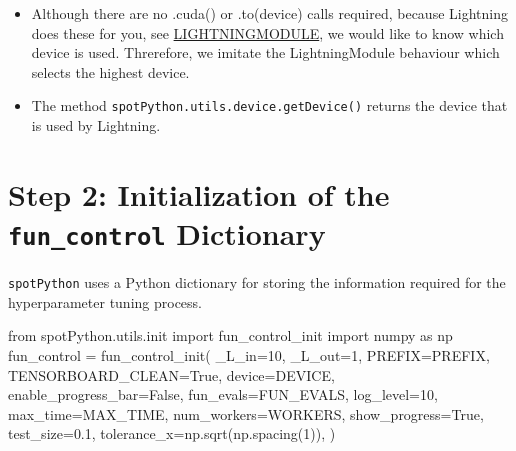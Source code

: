 \documentclass[
  letterpaper,
  DIV=11,
  numbers=noendperiod]{scrreprt}
\newenvironment{Shaded}{\begin{snugshade}}{\end{snugshade}}
\newcommand{\DecValTok}[1]{\textcolor[rgb]{0.68,0.00,0.00}{#1}}
\newcommand{\FloatTok}[1]{\textcolor[rgb]{0.68,0.00,0.00}{#1}}
\newcommand{\ImportTok}[1]{\textcolor[rgb]{0.00,0.46,0.62}{#1}}
\newcommand{\NormalTok}[1]{\textcolor[rgb]{0.00,0.23,0.31}{#1}}
\newcommand{\OperatorTok}[1]{\textcolor[rgb]{0.37,0.37,0.37}{#1}}
\newcommand{\VariableTok}[1]{\textcolor[rgb]{0.07,0.07,0.07}{#1}}
\providecommand{\tightlist}{%
  \setlength{\itemsep}{0pt}\setlength{\parskip}{0pt}}\usepackage{longtable,booktabs,array}
\begin{document}
\begin{tcolorbox}[enhanced jigsaw, rightrule=.15mm, coltitle=black, title=\textcolor{quarto-callout-note-color}{\faInfo}\hspace{0.5em}{Note: Device selection}, opacitybacktitle=0.6, bottomrule=.15mm, opacityback=0, left=2mm, colback=white, leftrule=.75mm, colframe=quarto-callout-note-color-frame, colbacktitle=quarto-callout-note-color!10!white, toprule=.15mm, toptitle=1mm, bottomtitle=1mm, titlerule=0mm, breakable, arc=.35mm]

\begin{itemize}
\tightlist
\item
  Although there are no .cuda() or .to(device) calls required, because
  Lightning does these for you, see
  \href{https://lightning.ai/docs/pytorch/stable/common/lightning_module.html}{LIGHTNINGMODULE},
  we would like to know which device is used. Threrefore, we imitate the
  LightningModule behaviour which selects the highest device.
\item
  The method \texttt{spotPython.utils.device.getDevice()} returns the
  device that is used by Lightning.
\end{itemize}

\end{tcolorbox}

\section{\texorpdfstring{Step 2: Initialization of the
\texttt{fun\_control}
Dictionary}{Step 2: Initialization of the fun\_control Dictionary}}\label{step-2-initialization-of-the-fun_control-dictionary}

\texttt{spotPython} uses a Python dictionary for storing the information
required for the hyperparameter tuning process.

\begin{Shaded}
\begin{Highlighting}[]
\ImportTok{from}\NormalTok{ spotPython.utils.init }\ImportTok{import}\NormalTok{ fun\_control\_init}
\ImportTok{import}\NormalTok{ numpy }\ImportTok{as}\NormalTok{ np}
\NormalTok{fun\_control }\OperatorTok{=}\NormalTok{ fun\_control\_init(}
\NormalTok{    \_L\_in}\OperatorTok{=}\DecValTok{10}\NormalTok{,}
\NormalTok{    \_L\_out}\OperatorTok{=}\DecValTok{1}\NormalTok{,}
\NormalTok{    PREFIX}\OperatorTok{=}\NormalTok{PREFIX,}
\NormalTok{    TENSORBOARD\_CLEAN}\OperatorTok{=}\VariableTok{True}\NormalTok{,}
\NormalTok{    device}\OperatorTok{=}\NormalTok{DEVICE,}
\NormalTok{    enable\_progress\_bar}\OperatorTok{=}\VariableTok{False}\NormalTok{,}
\NormalTok{    fun\_evals}\OperatorTok{=}\NormalTok{FUN\_EVALS,}
\NormalTok{    log\_level}\OperatorTok{=}\DecValTok{10}\NormalTok{,}
\NormalTok{    max\_time}\OperatorTok{=}\NormalTok{MAX\_TIME,}
\NormalTok{    num\_workers}\OperatorTok{=}\NormalTok{WORKERS,}
\NormalTok{    show\_progress}\OperatorTok{=}\VariableTok{True}\NormalTok{,}
\NormalTok{    test\_size}\OperatorTok{=}\FloatTok{0.1}\NormalTok{,}
\NormalTok{    tolerance\_x}\OperatorTok{=}\NormalTok{np.sqrt(np.spacing(}\DecValTok{1}\NormalTok{)),}
\NormalTok{    )}
\end{Highlighting}
\end{Shaded}
\end{document}
